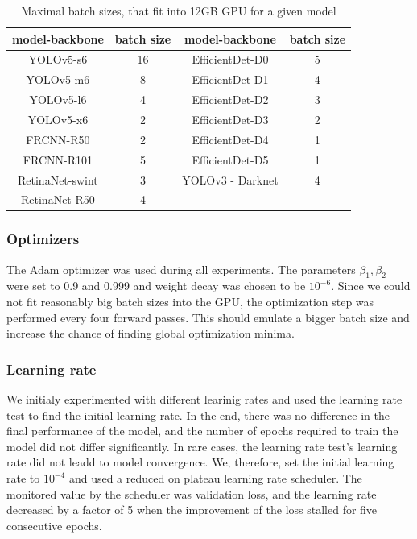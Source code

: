 \begin{table}
    \centering
    \begin{tabular}{|c|c|c|c|}
        \hline
        model-backbone  & batch size & model-backbone   & batch size \\ \hline
        YOLOv5-s6       & 16         & EfficientDet-D0  & 5          \\ \hline
        YOLOv5-m6       & 8          & EfficientDet-D1  & 4          \\ \hline
        YOLOv5-l6       & 4          & EfficientDet-D2  & 3          \\ \hline
        YOLOv5-x6       & 2          & EfficientDet-D3  & 2          \\ \hline
        FRCNN-R50       & 2          & EfficientDet-D4  & 1          \\ \hline
        FRCNN-R101      & 5          & EfficientDet-D5  & 1          \\ \hline
        RetinaNet-swint & 3          & YOLOv3 - Darknet & 4          \\ \hline
        RetinaNet-R50   & 4          & -                & -          \\ \hline
    \end{tabular}
    \caption{Maximal batch sizes, that fit into 12GB GPU for a given model}
    \label{tab:batch_sizes}
\end{table}



\subsubsection{Optimizers}
The Adam optimizer was used during all experiments. The parameters $\beta_1, \beta_2$ were set to 0.9 and 0.999 and weight decay was chosen to be $10^{-6}$. Since we could not fit reasonably big batch sizes into the GPU, the optimization step was performed every four forward passes. This should emulate a bigger batch size and increase the chance of finding global optimization minima.

\subsubsection{Learning rate}
We initialy experimented with different learinig rates and used the learning rate test to find the initial learning rate. In the end, there was no difference in the final performance of the model, and the number of epochs required to train the model did not differ significantly. In rare cases, the learning rate test's learning rate did not leadd to model convergence. We, therefore, set the initial learning rate to $10^{-4}$ and used a reduced on plateau learning rate scheduler. The monitored value by the scheduler was validation loss, and the learning rate decreased by a factor of 5 when the improvement of the loss stalled for five consecutive epochs.
